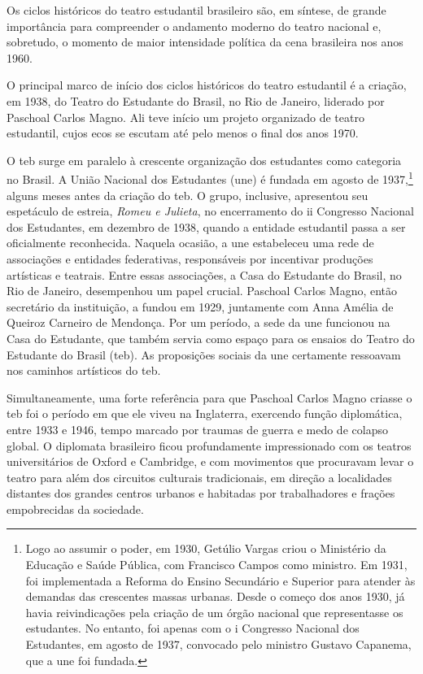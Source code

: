 Os ciclos históricos do teatro estudantil brasileiro são, em síntese,
de grande importância para compreender o andamento moderno do teatro
nacional e, sobretudo, o momento de maior intensidade política da cena
brasileira nos anos 1960.

\subject{Pedra angular: Teatro do Estudante do Brasil}

O principal marco de início dos ciclos históricos do teatro estudantil é
a criação, em 1938, do Teatro do Estudante do Brasil, no Rio de Janeiro,
liderado por Paschoal Carlos Magno. Ali teve início um projeto
organizado de teatro estudantil, cujos ecos se escutam até pelo menos o
final dos anos 1970.

O {\sc teb} surge em paralelo à crescente organização dos estudantes como
categoria no Brasil. A União Nacional dos Estudantes ({\sc une}) é fundada em
agosto de 1937,\footnote{Logo ao assumir o poder, em 1930, Getúlio Vargas
  criou o Ministério da Educação e Saúde Pública, com Francisco Campos
  como ministro. Em 1931, foi implementada a Reforma do Ensino
  Secundário e Superior para atender às demandas das crescentes massas
  urbanas. Desde o começo dos anos 1930, já havia reivindicações pela
  criação de um órgão nacional que representasse os estudantes. No
  entanto, foi apenas com o {\sc i} Congresso Nacional dos Estudantes, em
  agosto de 1937, convocado pelo ministro Gustavo Capanema, que a {\sc une}
  foi fundada.} alguns meses antes da criação do {\sc teb}. O grupo,
inclusive, apresentou seu espetáculo de estreia, {\it Romeu e Julieta},
no encerramento do {\sc ii} Congresso Nacional dos Estudantes, em dezembro de
1938, quando a entidade estudantil passa a ser oficialmente reconhecida.
Naquela ocasião, a {\sc une} estabeleceu uma rede de associações e entidades
federativas, responsáveis por incentivar produções artísticas e
teatrais. Entre essas associações, a Casa do Estudante do Brasil, no Rio
de Janeiro, desempenhou um papel crucial. Paschoal Carlos Magno, então
secretário da instituição, a fundou em 1929, juntamente com Anna Amélia
de Queiroz Carneiro de Mendonça. Por um período, a sede da {\sc une} funcionou
na Casa do Estudante, que também servia como espaço para os ensaios do
Teatro do Estudante do Brasil ({\sc teb}). As proposições sociais da {\sc une}
certamente ressoavam nos caminhos artísticos do {\sc teb}.

Simultaneamente, uma forte referência para que Paschoal Carlos Magno
criasse o {\sc teb} foi o período em que ele viveu na Inglaterra, exercendo
função diplomática, entre 1933 e 1946, tempo marcado por traumas de
guerra e medo de colapso global. O diplomata brasileiro ficou
profundamente impressionado com os teatros universitários de Oxford e
Cambridge, e com movimentos que procuravam levar o teatro para além dos
circuitos culturais tradicionais, em direção a localidades distantes dos
grandes centros urbanos e habitadas por trabalhadores e frações
empobrecidas da sociedade.

